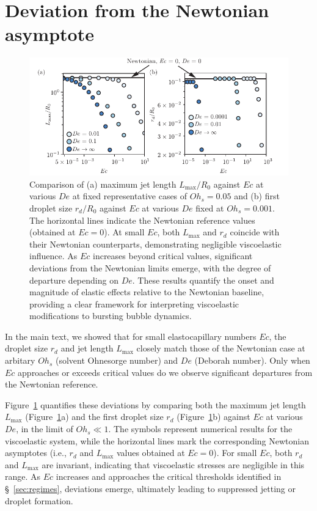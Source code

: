 \documentclass{jfm}
\newcommand{\oo}{\color{black} \normalfont}
\newcommand{\bb}{\color{black} \normalfont}
\begin{document}
\section{Deviation from the Newtonian asymptote}\label{app:devNewt}
\renewcommand{\thefigure}{\Alph{section}\,\arabic{figure}}
\setcounter{figure}{0}
\begin{figure}
    \centering
    \includegraphics[width=\textwidth]{LMaxRd-eps-converted-to.pdf}
    \caption{{\oo Comparison of (a) maximum jet length $L_{\text{max}}/R_0$ against $Ec$ at various $De$ at fixed representative cases of $Oh_s=0.05$ and (b) first droplet size $r_d/R_0$  against $Ec$ at various $De$ fixed at $Oh_s=0.001$. The horizontal lines indicate the Newtonian reference values (obtained at $Ec=0$). At small $Ec$, both $L_{\text{max}}$ and $r_d$ coincide with their Newtonian counterparts, demonstrating negligible viscoelastic influence. As $Ec$ increases beyond critical values, significant deviations from the Newtonian limits emerge, with the degree of departure depending on $De$. These results quantify the onset and magnitude of elastic effects relative to the Newtonian baseline, providing a clear framework for interpreting viscoelastic modifications to bursting bubble dynamics.\bb}}
    \label{fig:devNewt}
\end{figure}

In the main text, we showed that for small elastocapillary numbers $Ec$, the droplet size $r_d$ and jet length $L_{\text{max}}$ closely match those of the Newtonian case at arbitary $Oh_s$ (solvent Ohnesorge number) and $De$ (Deborah number). Only when $Ec$ approaches or exceeds critical values do we observe significant departures from the Newtonian reference.

Figure~\ref{fig:devNewt} quantifies these deviations by comparing both the maximum jet length $L_{\text{max}}$ (Figure~\ref{fig:devNewt}a) and the first droplet size $r_d$ (Figure~\ref{fig:devNewt}b) against $Ec$ at various $De$, in the limit of $Oh_s \ll 1$. The symbols represent numerical results for the viscoelastic system, while the horizontal lines mark the corresponding Newtonian asymptotes (i.e., $r_d$ and $L_{\text{max}}$ values obtained at $Ec=0$). For small $Ec$, both $r_d$ and $L_{\text{max}}$ are invariant, indicating that viscoelastic stresses are negligible in this range. As $Ec$ increases and approaches the critical thresholds identified in \S~\ref{sec:regimes}, deviations emerge, ultimately leading to suppressed jetting or droplet formation.
\end{document}
